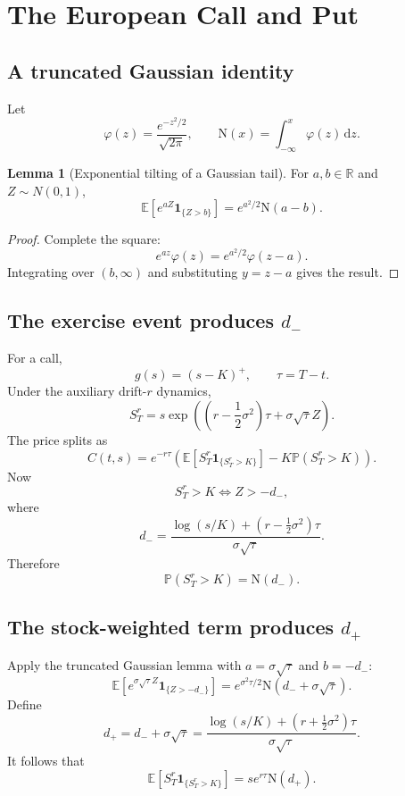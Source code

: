 \documentclass[10pt]{article}
\newcommand{\E}{\mathbb E}
\newcommand{\Pp}{\mathbb P}
\newcommand{\R}{\mathbb R}
\newcommand{\1}{\mathbf 1}
\newcommand{\dd}{\,\mathrm d}
\newcommand{\Ncdf}{\mathrm N}
\newcommand{\phiN}{\varphi}
\theoremstyle{definition}
\newtheorem{lemma}[definition]{Lemma}
\begin{document}
\section{The European Call and Put}

\subsection{A truncated Gaussian identity}

Let
\[
\phiN(z)=\frac{e^{-z^2/2}}{\sqrt{2\pi}},
\qquad
\Ncdf(x)=\int_{-\infty}^x\phiN(z)\dd z.
\]

\begin{lemma}[Exponential tilting of a Gaussian tail]
For \(a,b\in\R\) and \(Z\sim N(0,1)\),
\[
\boxed{
\E\left[e^{aZ}\1_{\{Z>b\}}\right]
=e^{a^2/2}\Ncdf(a-b).}
\]
\end{lemma}
\begin{proof}
Complete the square:
\[
e^{az}\phiN(z)
=e^{a^2/2}\phiN(z-a).
\]
Integrating over \((b,\infty)\) and substituting \(y=z-a\) gives the result.
\end{proof}

\subsection{The exercise event produces \texorpdfstring{\(d_-\)}{d-minus}}

For a call,
\[
g(s)=(s-K)^+,
\qquad
\tau=T-t.
\]
Under the auxiliary drift-\(r\) dynamics,
\[
S_T^r
=s\exp\left(
\left(r-\frac12\sigma^2\right)\tau
+\sigma\sqrt{\tau}Z
\right).
\]
The price splits as
\[
C(t,s)
=e^{-r\tau}
\left(
\E[S_T^r\1_{\{S_T^r>K\}}]
-K\Pp(S_T^r>K)
\right).
\]
Now
\[
S_T^r>K
\iff
Z>-d_-,
\]
where
\[
\boxed{
d_-=
\frac{\log(s/K)+(r-\frac12\sigma^2)\tau}
{\sigma\sqrt{\tau}}.}
\]
Therefore
\[
\Pp(S_T^r>K)=\Ncdf(d_-).
\]

\subsection{The stock-weighted term produces \texorpdfstring{\(d_+\)}{d-plus}}

Apply the truncated Gaussian lemma with
\(a=\sigma\sqrt{\tau}\) and \(b=-d_-\):
\[
\E\left[
e^{\sigma\sqrt{\tau}Z}\1_{\{Z>-d_-\}}
\right]
=e^{\sigma^2\tau/2}
\Ncdf(d_-+\sigma\sqrt{\tau}).
\]
Define
\[
\boxed{
d_+=d_-+\sigma\sqrt{\tau}
=\frac{\log(s/K)+(r+\frac12\sigma^2)\tau}
{\sigma\sqrt{\tau}}.}
\]
It follows that
\[
\E[S_T^r\1_{\{S_T^r>K\}}]
=se^{r\tau}\Ncdf(d_+).
\]
\end{document}
